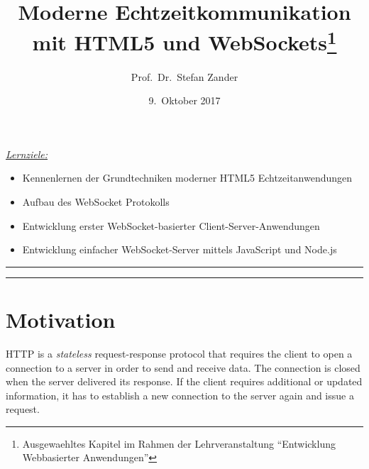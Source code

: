 \documentclass[a4paper, justified, notoc]{tufte-handout} %
\title{Moderne Echtzeitkommunikation mit HTML5 und WebSockets\thanks{Ausgewaehltes Kapitel im Rahmen der Lehrveranstaltung ``Entwicklung Webbasierter Anwendungen''}}
\author[opt Author]{Prof.\ Dr.\ Stefan Zander}
\date{9.\ Oktober 2017}  %
\newenvironment{lernziele}{
	\begin{mdframed}[hidealllines=true,backgroundcolor=gray!20] 
	\small \itshape
	\noindent \underline{Lernziele:} 
	} 
	{ 
	\end{mdframed}
}
\begin{document}
\maketitle%


\begin{lernziele}
\begin{itemize}
	\item Kennenlernen der Grundtechniken moderner HTML5 Echtzeitanwendungen
	\item Aufbau des WebSocket Protokolls
	\item Entwicklung erster WebSocket-basierter Client-Server-Anwendungen
	\item Entwicklung einfacher WebSocket-Server mittels JavaScript und Node.js 
\end{itemize}
\end{lernziele}


\setcounter{secnumdepth}{2} %

\noindent \rule{1.54\textwidth}{0.4pt}
\tableofcontents
\noindent \rule{1.54\textwidth}{0.4pt}

\section{Motivation}\label{sec:page-layout}
HTTP is a \emph{stateless} request-response protocol that requires the client to open a connection to a server in order to send and receive data. The connection is closed when the server delivered its response. If the client requires additional or updated information, it has to establish a new connection to the server again and issue a request. 
\end{document}
